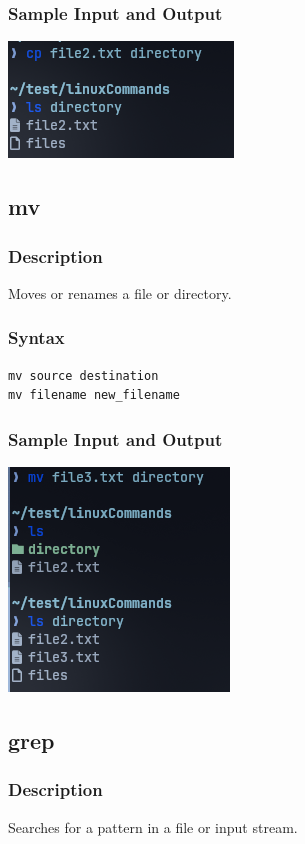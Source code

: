 \subsubsection{Sample Input and Output}
\includegraphics[]{Cycle_1//Outputs/cp.png}


\subsection{mv}
\subsubsection{Description}
Moves or renames a file or directory.

\subsubsection{Syntax}
\begin{verbatim}
mv source destination
mv filename new_filename
\end{verbatim}

\subsubsection{Sample Input and Output}
\includegraphics[]{Cycle_1//Outputs/mv.png}


\subsection{grep}
\subsubsection{Description}
Searches for a pattern in a file or input stream.

